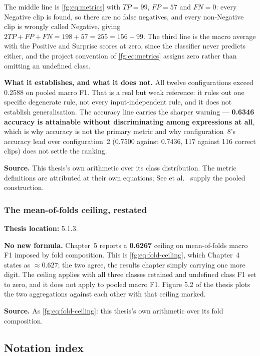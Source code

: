 \documentclass[11pt,a4paper]{article}
\numberwithin{equation}{section}
\begin{document}
The middle line is \eqref{fg:eq:metrics} with $TP = 99$, $FP = 57$ and $FN = 0$:
every Negative clip is found, so there are no false negatives, and every
non-Negative clip is wrongly called Negative, giving
$2TP + FP + FN = 198 + 57 = 255 = 156 + 99$. The third line is the macro
average with the Positive and Surprise scores at zero, since the classifier
never predicts either, and the project convention of \eqref{fg:eq:metrics} assigns
zero rather than omitting an undefined class.

\textbf{What it establishes, and what it does not.} All twelve configurations
exceed 0.2588 on pooled macro F1. That is a real but weak reference: it
rules out one specific degenerate rule, not every input-independent rule, and
it does not establish generalisation. The accuracy line carries the sharper
warning --- \textbf{0.6346 accuracy is attainable without discriminating among
expressions at all}, which is why accuracy is not the primary metric and why
configuration~8's accuracy lead over configuration~2 (0.7500 against 0.7436,
117 against 116 correct clips) does not settle the ranking.

\textbf{Source.} This thesis's own arithmetic over its class distribution. The
metric definitions are attributed at their own equations; See et
al.~\cite{see2019} supply the pooled construction.

\subsubsection{The mean-of-folds ceiling, restated}
\label{fg5:ceiling-ch5}
\textbf{Thesis location:} 5.1.3.

\textbf{No new formula.} Chapter~5 reports a \textbf{0.6267} ceiling on
mean-of-folds macro F1 imposed by fold composition. This is
\eqref{fg:eq:fold-ceiling}, which Chapter~4 states as $\approx 0.627$; the two agree, the
results chapter simply carrying one more digit. The ceiling applies with all
three classes retained and undefined class F1 set to zero, and it does not
apply to pooled macro F1. Figure 5.2 of the thesis plots the two aggregations
against each other with that ceiling marked.

\textbf{Source.} As \eqref{fg:eq:fold-ceiling}: this thesis's own arithmetic over its fold
composition.

\subsection{Notation index}
\label{fg5:notation}
\end{document}
